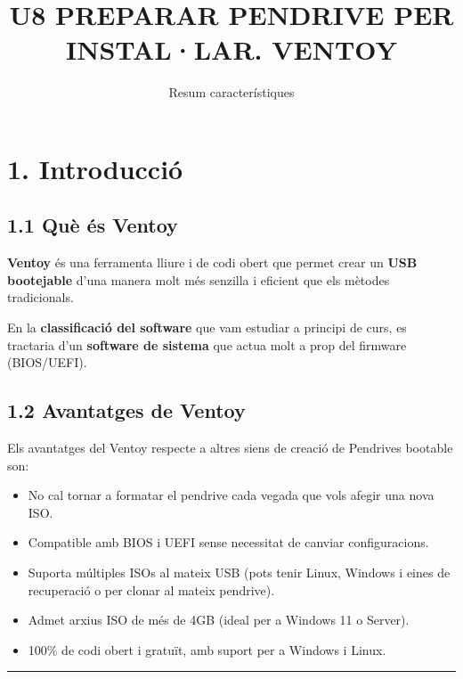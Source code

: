 \documentclass[
  spanish,
  12 pt,
  a4paper,
]{article}
\title{U8 PREPARAR PENDRIVE PER INSTAL·LAR. VENTOY}
\subtitle{Resum característiques}
\author{}
\date{\vspace{-2.5em}}
\providecommand{\tightlist}{%
  \setlength{\itemsep}{0pt}\setlength{\parskip}{0pt}}
\begin{document}
\maketitle

\newpage

\renewcommand\tablename{Tabla}

\section{1. Introducció}\label{introducciuxf3}

\subsection{1.1 Què és Ventoy}\label{quuxe8-uxe9s-ventoy}

\textbf{Ventoy} és una ferramenta lliure i de codi obert que permet
crear un \textbf{USB bootejable} d'una manera molt més senzilla i
eficient que els mètodes tradicionals.

En la \textbf{classificació del software} que vam estudiar a principi de
curs, es tractaria d'un \textbf{software de sistema} que actua molt a
prop del firmware (BIOS/UEFI).

\subsection{1.2 Avantatges de Ventoy}\label{avantatges-de-ventoy}

Els avantatges del Ventoy respecte a altres siens de creació de
Pendrives bootable son:

\begin{itemize}
\tightlist
\item
  No cal tornar a formatar el pendrive cada vegada que vols afegir una
  nova ISO.
\item
  Compatible amb BIOS i UEFI sense necessitat de canviar configuracions.
\item
  Suporta múltiples ISOs al mateix USB (pots tenir Linux, Windows i
  eines de recuperació o per clonar al mateix pendrive).
\item
  Admet arxius ISO de més de 4GB (ideal per a Windows 11 o Server).
\item
  100\% de codi obert i gratuït, amb suport per a Windows i Linux.
\end{itemize}

\begin{center}\rule{0.5\linewidth}{0.5pt}\end{center}
\end{document}
